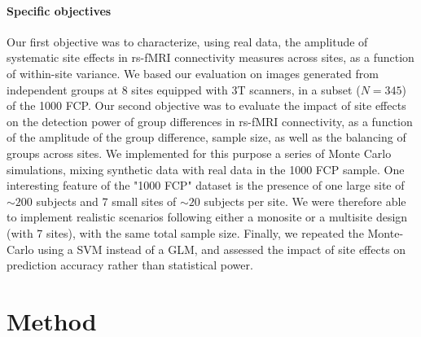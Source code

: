 \documentclass[authoryear]{elsarticle}
\begin{document}
\paragraph{Specific objectives}
Our first objective was to characterize, using real data, the amplitude of
systematic site effects in rs-fMRI connectivity measures across sites, as a function
of within-site variance. We based our evaluation on images generated from
independent groups at 8 sites equipped with 3T scanners, in a subset
($N=345$) of the 1000 FCP. Our second objective was to evaluate the impact of
site effects on the detection power of group differences in rs-fMRI
connectivity, as a function of the amplitude of the group difference, sample
size, as well as the balancing of groups across sites. We implemented for this
purpose a series of Monte Carlo simulations, mixing synthetic data with real
data in the 1000 FCP sample. One interesting feature of the "1000 FCP" dataset is the presence of one large site of $\sim200$ subjects and 7 small sites of $\sim20$ subjects per site. We were therefore able to implement realistic scenarios following either a monosite or a multisite design (with 7 sites), with the same total sample size. Finally, we repeated the Monte-Carlo using a SVM instead of a GLM, and assessed the impact of site effects on prediction accuracy rather than statistical power.

\section{Method}
\end{document}
